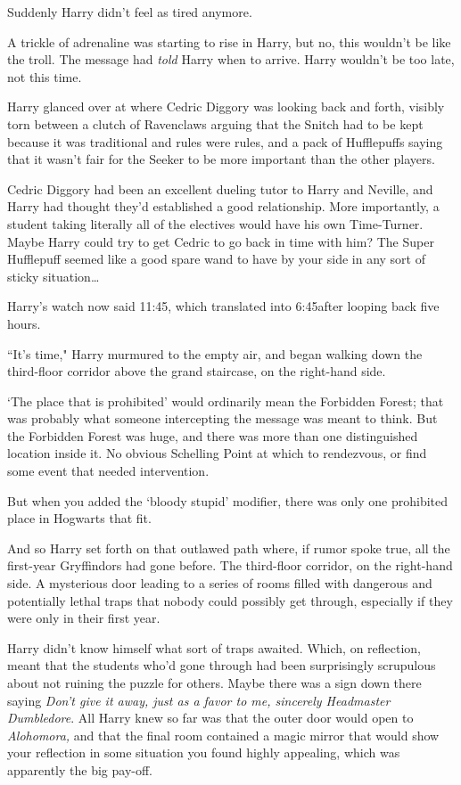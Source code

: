 Suddenly Harry didn't feel as tired anymore.

A trickle of adrenaline was starting to rise in Harry, but no, this wouldn't be like the troll. The message had \emph{told} Harry when to arrive. Harry wouldn't be too late, not this time.

Harry glanced over at where Cedric Diggory was looking back and forth, visibly torn between a clutch of Ravenclaws arguing that the Snitch had to be kept because it was traditional and rules were rules, and a pack of Hufflepuffs saying that it wasn't fair for the Seeker to be more important than the other players.

Cedric Diggory had been an excellent dueling tutor to Harry and Neville, and Harry had thought they'd established a good relationship. More importantly, a student taking literally all of the electives would have his own Time-Turner. Maybe Harry could try to get Cedric to go back in time with him? The Super Hufflepuff seemed like a good spare wand to have by your side in any sort of sticky situation{\ldots}


Harry's watch now said 11:45, which translated into 6:45\pm after looping back five hours.

``It's time," Harry murmured to the empty air, and began walking down the third-floor corridor above the grand staircase, on the right-hand side.

`The place that is prohibited' would ordinarily mean the Forbidden Forest; that was probably what someone intercepting the message was meant to think. But the Forbidden Forest was huge, and there was more than one distinguished location inside it. No obvious Schelling Point at which to rendezvous, or find some event that needed intervention.

But when you added the `bloody stupid' modifier, there was only one prohibited place in Hogwarts that fit.

And so Harry set forth on that outlawed path where, if rumor spoke true, all the first-year Gryffindors had gone before. The third-floor corridor, on the right-hand side. A mysterious door leading to a series of rooms filled with dangerous and potentially lethal traps that nobody could possibly get through, especially if they were only in their first year.

Harry didn't know himself what sort of traps awaited. Which, on reflection, meant that the students who'd gone through had been surprisingly scrupulous about not ruining the puzzle for others. Maybe there was a sign down there saying \emph{Don't give it away, just as a favor to me, sincerely Headmaster Dumbledore}. All Harry knew so far was that the outer door would open to \emph{Alohomora,} and that the final room contained a magic mirror that would show your reflection in some situation you found highly appealing, which was apparently the big pay-off.

